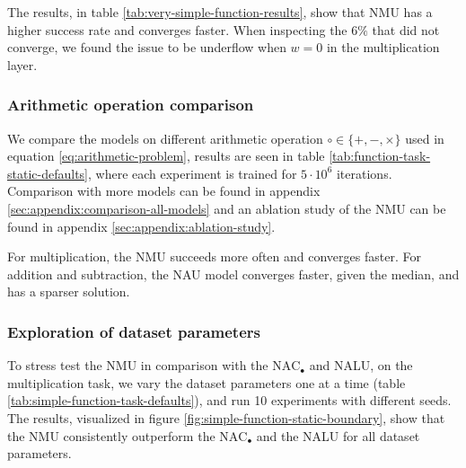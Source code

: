 The results, in table \ref{tab:very-simple-function-results}, show that NMU has a higher success rate and converges faster. When inspecting the $6\%$ that did not converge, we found the issue to be underflow when $w = 0$ in the multiplication layer.


\subsubsection{Arithmetic operation comparison}
We compare the models on different arithmetic operation $\circ \in \{+, -, \times\}$ used in equation \ref{eq:arithmetic-problem}, results are seen in table \ref{tab:function-task-static-defaults}, where each experiment is trained for $5 \cdot 10^6$ iterations. Comparison with more models can be found in appendix \ref{sec:appendix:comparison-all-models} and an ablation study of the NMU can be found in appendix \ref{sec:appendix:ablation-study}.

For multiplication, the NMU succeeds more often and converges faster. For addition and subtraction, the NAU model converges faster, given the median, and has a sparser solution.



\subsubsection{Exploration of dataset parameters}
To stress test the NMU in comparison with the  $\mathrm{NAC}_{\bullet}$ and NALU, on the multiplication task, we vary the dataset parameters one at a time (table \ref{tab:simple-function-task-defaults}), and run 10 experiments with different seeds. The results, visualized in figure \ref{fig:simple-function-static-boundary}, show that the NMU consistently outperform the $\mathrm{NAC}_{\bullet}$ and the NALU for all dataset parameters.

